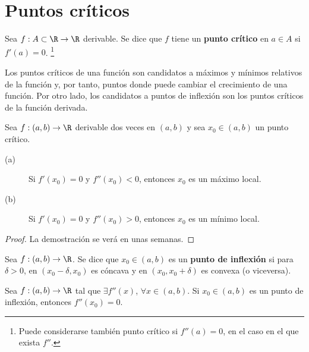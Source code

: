 \section{Puntos críticos}
\begin{fdefinition}
\normalfont Sea $\displaystyle f : A \subset \R \to \R $ derivable. Se dice que $\displaystyle f $ tiene un \textbf{punto crítico} en $\displaystyle a \in A $ si $\displaystyle f'\left(a\right) = 0 $. \footnote{Puede considerarse también punto crítico si $\displaystyle f''\left(a\right) = 0 $, en el caso en el que exista $\displaystyle f'' $.} 
\end{fdefinition}
\begin{observation}
\normalfont Los puntos críticos de una función son candidatos a máximos y mínimos relativos de la función y, por tanto, puntos donde puede cambiar el crecimiento de una función. Por otro lado, los candidatos a puntos de inflexión son los puntos críticos de la función derivada.
\end{observation}
\begin{ftheorem}[]
\normalfont Sea $\displaystyle f : \left(a,b\right) \to \R $ derivable dos veces en $\displaystyle \left(a,b\right) $ y sea $\displaystyle x_{0} \in \left(a,b\right) $ un punto crítico. 
\begin{description}
\item[(a)] Si $\displaystyle f'\left(x_{0}\right) = 0 $ y $\displaystyle f''\left(x_{0}\right) < 0 $, entonces $\displaystyle x_{0} $ es un máximo local.
\item[(b)] Si $\displaystyle f'\left(x_{0}\right) = 0 $ y $\displaystyle f''\left(x_{0}\right) > 0 $, entonces $\displaystyle x_{0} $ es un mínimo local.
\end{description}
\end{ftheorem}
\begin{proof}
La demostración se verá en unas semanas.
\end{proof}
\begin{fdefinition}
\normalfont Sea $\displaystyle f : \left(a,b\right) \to \R $. Se dice que $\displaystyle x_{0} \in \left(a,b\right) $ es un \textbf{punto de inflexión} si para $\displaystyle \delta > 0 $, en $\displaystyle \left(x_{0}-\delta, x_{0}\right) $ es cóncava y en $\displaystyle \left(x_{0}, x_{0} + \delta \right) $ es convexa (o viceversa).
\end{fdefinition}
\begin{ftheorem}[]
\normalfont Sea $\displaystyle f : \left(a,b\right) \to \R $ tal que $\displaystyle \exists f''\left(x\right) $, $\displaystyle \forall x \in \left(a,b\right) $. Si $\displaystyle x_{0} \in \left(a,b\right) $ es un punto de inflexión, entonces $\displaystyle f''\left(x_{0}\right) = 0 $.
\end{ftheorem}
